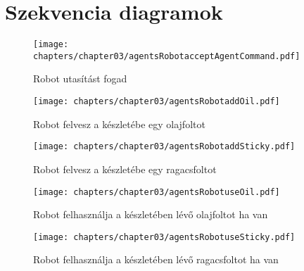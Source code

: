 \section{Szekvencia diagramok}

\begin{figure}[h]
	\begin{center}
		\texttt{[image: chapters/chapter03/agentsRobotacceptAgentCommand.pdf]}
		\caption{Robot utasítást fogad}
		\label{fig:agents.Robot.accept}
	\end{center}
\end{figure}

\begin{figure}[h]
	\begin{center}
		\texttt{[image: chapters/chapter03/agentsRobotaddOil.pdf]}
		\caption{Robot felvesz a készletébe egy olajfoltot}
		\label{fig:agents.Robot.addOil}
	\end{center}
\end{figure}

\begin{figure}[h]
	\begin{center}
		\texttt{[image: chapters/chapter03/agentsRobotaddSticky.pdf]}
		\caption{Robot felvesz a készletébe egy ragacsfoltot}
		\label{fig:agents.Robot.addSticky}
	\end{center}
\end{figure}

\begin{figure}[h]
	\begin{center}
		\texttt{[image: chapters/chapter03/agentsRobotuseOil.pdf]}
		\caption{Robot felhasználja a készletében lévő olajfoltot ha van}
		\label{fig:agents.Robot.useOil}
	\end{center}
\end{figure}

\begin{figure}[h]
	\begin{center}
		\texttt{[image: chapters/chapter03/agentsRobotuseSticky.pdf]}
		\caption{Robot felhasználja a készletében lévő ragacsfoltot ha van}
		\label{fig:agents.Robot.useSticky}
	\end{center}
\end{figure}

